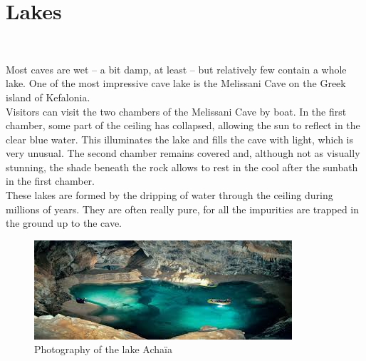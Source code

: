 \documentclass[draft, final]{report}
\begin{document}
\section{Lakes}
~\par
Most caves are wet – a bit damp, at least – but relatively few contain a whole lake. One of the most impressive cave lake is the Melissani Cave on the Greek island of Kefalonia.\\
Visitors can visit the two chambers of the Melissani Cave by boat. In the first chamber, some part of the ceiling has collapsed, allowing the sun to reflect in the clear blue water. This illuminates the lake and fills the cave with light, which is very unusual. The second chamber remains covered and, although not as visually stunning, the shade beneath the rock  allows to rest in the cool after the sunbath in the first chamber.\\
These lakes are formed by the dripping of water through the ceiling during millions of years. They are often really pure, for all the impurities are trapped in the ground up to the cave.
\begin{figure}[!ht]
  \centering
  \includegraphics[scale=1]{LateX/Images/lake.jpg}
  \caption{Photography of the lake Achaïa\cite{lakeincave}}
\end{figure}
\end{document}
